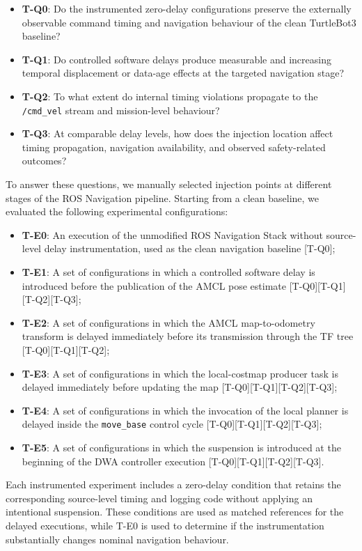 \begin{itemize}[nosep]
    \item \textbf{T-Q0}: Do the instrumented zero-delay configurations preserve the externally observable command timing and navigation behaviour of the clean TurtleBot3 baseline?
    \item \textbf{T-Q1}: Do controlled software delays produce measurable and increasing temporal displacement or data-age effects at the targeted navigation stage?
    \item \textbf{T-Q2}: To what extent do internal timing violations propagate to the \texttt{/cmd\_vel} stream and mission-level behaviour?
    \item \textbf{T-Q3}: At comparable delay levels, how does the injection location affect timing propagation, navigation availability, and observed safety-related outcomes?
\end{itemize}
To answer these questions, we manually selected injection points at different stages of the ROS Navigation pipeline. Starting from a clean baseline, we evaluated the following experimental configurations:
\begin{itemize}[nosep]
    \item \textbf{T-E0}: An execution of the unmodified ROS Navigation Stack without source-level delay instrumentation, used as the clean navigation baseline [T-Q0];
    \item \textbf{T-E1}: A set of configurations in which a controlled software delay is introduced before the publication of the AMCL pose estimate [T-Q0][T-Q1][T-Q2][T-Q3];
    \item \textbf{T-E2}: A set of configurations in which the AMCL map-to-odometry transform is delayed immediately before its transmission through the TF tree [T-Q0][T-Q1][T-Q2];
    \item \textbf{T-E3}: A set of configurations in which the local-costmap producer task is delayed immediately before updating the map [T-Q0][T-Q1][T-Q2][T-Q3];
    \item \textbf{T-E4}: A set of configurations in which the invocation of the local planner is delayed inside the \texttt{move\_base} control cycle [T-Q0][T-Q1][T-Q2][T-Q3];
    \item \textbf{T-E5}: A set of configurations in which the suspension is introduced at the beginning of the DWA controller execution [T-Q0][T-Q1][T-Q2][T-Q3].
\end{itemize}
Each instrumented experiment includes a zero-delay condition that retains the corresponding source-level timing and logging code without applying an intentional suspension. These conditions are used as matched references for the delayed executions, while T-E0 is used to determine if the instrumentation substantially changes nominal navigation behaviour.
